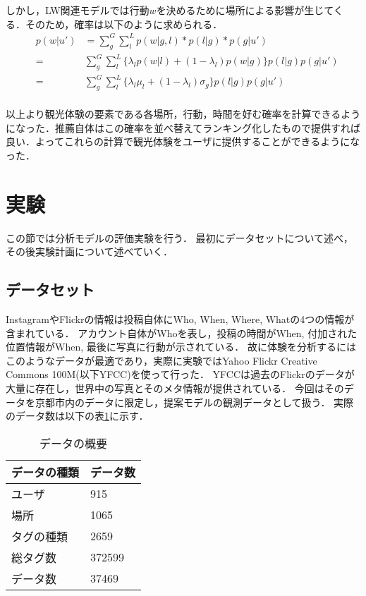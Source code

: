 \documentclass[a4j,10pt, twocolumn]{jarticle}
\begin{document}
しかし，LW関連モデルでは行動$w$を決めるために場所による影響が生じてくる．そのため，確率は以下のように求められる．
\begin{eqnarray*}
  &p(w|u')& = \sum_g^G \sum_l^L p(w|g, l) * p(l|g) * p(g|u') \\
  &=& \sum_g^G \sum_l^L \{ \lambda_l p(w|l) + (1-\lambda_l) p(w|g) \} p(l|g) p(g|u') \\
  &=& \sum_g^G \sum_l^L \{ \lambda_l \mu_l + (1-\lambda_l) \sigma_g \} p(l|g) p(g|u') \\
\end{eqnarray*}

以上より観光体験の要素である各場所，行動，時間を好む確率を計算できるようになった．推薦自体はこの確率を並べ替えてランキング化したもので提供すれば良い．よってこれらの計算で観光体験をユーザに提供することができるようになった．

\section{実験} \label{experiment}
この節では分析モデルの評価実験を行う．
最初にデータセットについて述べ，その後実験計画について述べていく．

\subsection{データセット} \label{dataset}
InstagramやFlickrの情報は投稿自体にWho, When, Where, Whatの4つの情報が含まれている．
アカウント自体がWhoを表し，投稿の時間がWhen, 付加された位置情報がWhen, 最後に写真に行動が示されている．
故に体験を分析するにはこのようなデータが最適であり，実際に実験ではYahoo Flickr Creative Commons 100M(以下YFCC)\cite{thomee2016yfcc100m}を使って行った．
YFCCは過去のFlickrのデータが大量に存在し，世界中の写真とそのメタ情報が提供されている．
今回はそのデータを京都市内のデータに限定し，提案モデルの観測データとして扱う．
実際のデータ数は以下の表\ref{dataset-table}に示す．

\begin{table}[thb]
  \begin{center}
    \caption{データの概要}
    \label{dataset-table}
    \begin{tabular}{|p{5cm}|p{1.5cm}|} \hline
      データの種類 & データ数 \\ \hline \hline
      ユーザ & 915 \\
      場所 & 1065 \\
      タグの種類 & 2659 \\
      総タグ数 & 372599 \\ \hline
      データ数 & 37469 \\ \hline
    \end{tabular}
  \end{center}
\end{table}
\end{document}
